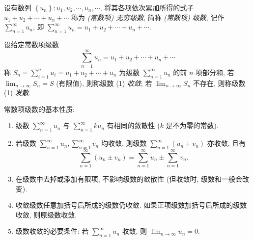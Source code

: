 \begin{definition}[常数项级数]
    设有数列 $ \left\{u_{n}\right\}: u_{1}, u_{2}, \cdots, u_{n}, \cdots $, 将其各项依次累加所得的式子 $ u_{1}+u_{2}+\cdots+u_{n}+\cdots$ 称为 \textit{(常数项) 无穷级数}, 简称 \textit{(常数项) 级数}, 记作 $\displaystyle \sum_{n=1}^{\infty} u_{n} $, 即 $\displaystyle \sum_{n=1}^{\infty} u_{n}=u_{1}+u_{2}+\cdots+   u_{n}+\cdots .$
\end{definition}

\begin{definition}[常数项级数收敛]
    设给定常数项级数
    \begin{equation}
        \sum_{n=1}^{\infty} u_{n}=u_{1}+u_{2}+\cdots+u_{n}+\cdots
        \tag{1}
    \end{equation}
    称 $\displaystyle S_{n}=\sum_{i=1}^{n} u_{i}=u_{1}+u_{2}+\cdots+u_{n} $ 为级数 $\displaystyle \sum_{n=1}^{\infty} u_{n} $ 的前 $ n $ 项部分和, 若 $\displaystyle \lim _{n \rightarrow \infty} S_{n}=S $ (有限值), 则称级数 (1) \textit{收敛}; 若 $\displaystyle \lim _{n \rightarrow \infty} S_{n} $ 不存在, 则称级数 (1) \textit{发散}.
\end{definition}

常数项级数的基本性质:
\begin{enumerate}[label=(\arabic{*})]
    \item 级数 $\displaystyle \sum_{n=1}^{\infty} u_{n} $ 与 $\displaystyle \sum_{n=1}^{\infty} k u_{n} $ 有相同的敛散性 ($k $ 是不为零的常数).
    \item 若级数 $\displaystyle \sum_{n=1}^{\infty} u_{n}, \sum_{n=1}^{\infty} v_{n} $ 均收敛, 则级数 $\displaystyle \sum_{n=1}^{\infty}\left(u_{n} \pm v_{n}\right) $ 亦收敛, 且有
          $$\sum_{n=1}^{\infty}\left(u_{n} \pm v_{n}\right)=\sum_{n=1}^{\infty} u_{n} \pm \sum_{n=1}^{\infty} v_{n} .$$
    \item 在级数中去掉或添加有限项, 不影响级数的敛散性 (但收敛时, 级数和一般会改变).
    \item 收敛级数任意加括号后所成的级数仍收敛. 如果正项级数加括号后所成的级数收敛, 则原级数收敛.
    \item 级数收敛的必要条件: 若 $\displaystyle \sum_{n=1}^{\infty} u_{n} $ 收敛, 则 $\displaystyle \lim _{n \rightarrow \infty} u_{n}=0 $.
\end{enumerate}

